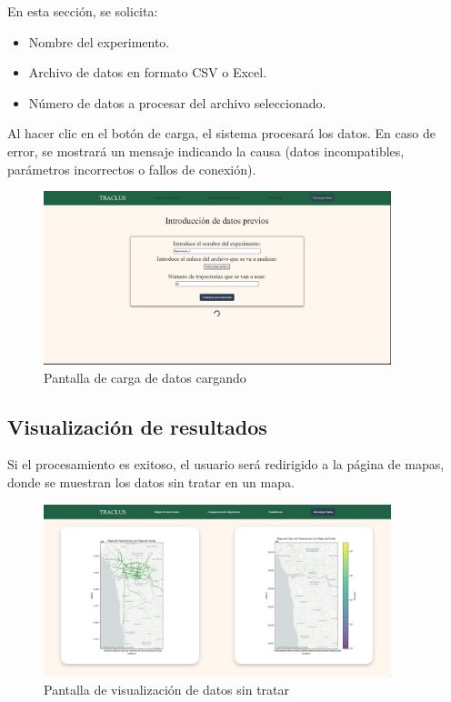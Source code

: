 En esta sección, se solicita:

\begin{itemize}
    \item Nombre del experimento.
    \item Archivo de datos en formato CSV o Excel.
    \item Número de datos a procesar del archivo seleccionado.
\end{itemize}

Al hacer clic en el botón de carga, el sistema procesará los datos. En caso de error, se mostrará un mensaje indicando la causa (datos incompatibles, parámetros incorrectos o fallos de conexión).

\begin{figure}[H]
    \centering
    \includegraphics[width=0.9\textwidth]{img/load_page_loading.png}
    \caption{Pantalla de carga de datos cargando}
\end{figure}

\subsection{Visualización de resultados}

Si el procesamiento es exitoso, el usuario será redirigido a la página de mapas, donde se muestran los datos sin tratar en un mapa.

\begin{figure}[H]
    \centering
    \includegraphics[width=0.9\textwidth]{img/Map_page.png}
    \caption{Pantalla de visualización de datos sin tratar}
\end{figure}

